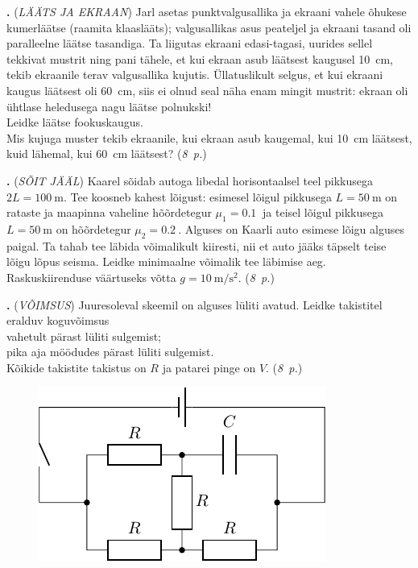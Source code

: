 \documentclass[11pt,a5paper]{article}
\newcommand{\numb}[1]{\vspace{5pt}\textbf{\large #1}}
\newcommand{\nimi}[1]{(\textsl{\small #1})}
\newcommand{\punktid}[1]{(\emph{#1~p.})}
\newcounter{ylesanne}
\newcommand{\yl}[1]{\addtocounter{ylesanne}{1}\numb{\theylesanne.} \nimi{#1} \newblock{}}
\newcommand{\autor}[1]{}
\begin{document}
\yl{LÄÄTS JA EKRAAN}
Jarl asetas punktvalgusallika ja ekraani vahele õhukese kumerläätse (raamita klaaslääts); valgusallikas asus peateljel ja ekraani tasand oli paralleelne läätse tasandiga. Ta liigutas ekraani edasi-tagasi, uurides sellel tekkivat mustrit ning pani tähele, et kui ekraan asub läätsest kaugusel \SI{10}{\cm}, tekib ekraanile terav valgusallika kujutis. Üllatuslikult selgus, et kui ekraani kaugus läätsest oli \SI{60}{\cm}, siis ei olnud seal näha enam mingit mustrit: ekraan oli ühtlase heledusega nagu läätse polnukski!\\
\osa Leidke läätse fookuskaugus.\\
\osa Mis kujuga muster tekib ekraanile, kui ekraan asub kaugemal, kui \SI{10}{\cm} läätsest, kuid lähemal, kui \SI{60}{\cm} läätsest?
\punktid{8} \autor{Oleg Košik}

\newpage
\yl{SÕIT JÄÄL} Kaarel sõidab autoga libedal horisontaalsel teel pikkusega $2L=\SI{100}{\m}$. Tee koosneb kahest lõigust: esimesel lõigul pikkusega $L=\SI{50}{\m}$ on rataste ja maapinna vaheline hõõrdetegur $\mu_1=\SI{0.1}{}$ ja teisel lõigul pikkusega $L=\SI{50}{\m}$ on hõõrdetegur $\mu_2=\SI{0.2}{}$. Alguses on Kaarli auto esimese lõigu alguses paigal. Ta tahab tee läbida võimalikult kiiresti, nii et auto jääks täpselt teise lõigu lõpus seisma. Leidke minimaalne võimalik tee läbimise aeg. Raskuskiirenduse väärtuseks võtta $g=\SI{10}{\m\per\s\squared}$.
\punktid{8} \autor{Richar Luhtaru}

\yl{VÕIMSUS}
Juuresoleval skeemil on alguses lüliti avatud. Leidke takistitel eralduv koguvõimsus \\
\osa vahetult pärast lüliti sulgemist; \\
\osa pika aja möödudes pärast lüliti sulgemist.\\
Kõikide takistite takistus on $R$ ja patarei pinge on $V$.
\punktid{8} \autor{Kaur Aare Saar}
\vspace{-4pt}
\begin{figure}[h]
  \centering
  \begin{minipage}[h]{0.44\textwidth}
    \includegraphics[width=\textwidth]{skeem.pdf}
  \end{minipage}
 \end{figure}
\vspace{-12pt}
\end{document}
